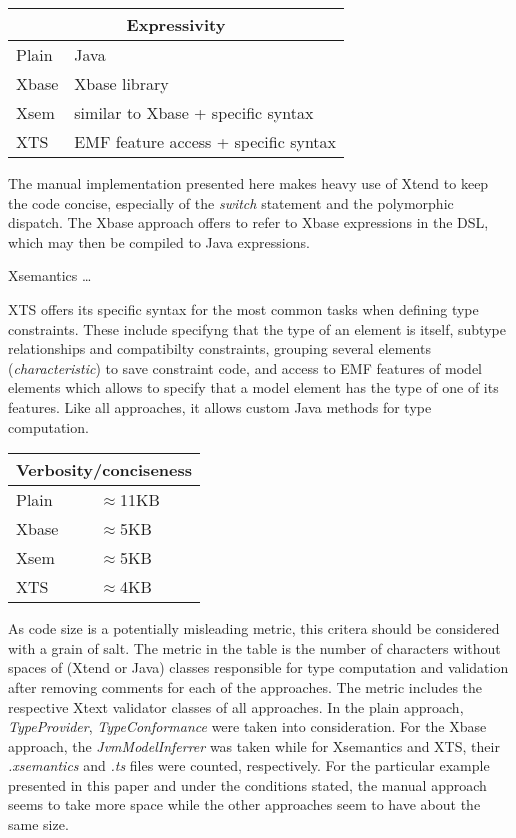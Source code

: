 \begin{tabularx}{\linewidth}{ l   X }
\multicolumn{2}{c}{Expressivity} \\ \hline
Plain & Java \\
Xbase & Xbase library \\
Xsem & similar to Xbase + specific syntax\\
XTS & EMF feature access + specific syntax\\
\end{tabularx}

\noindent The manual implementation presented here makes heavy use of Xtend to
keep the code concise, especially of the \emph{switch} statement and the polymorphic
dispatch. The Xbase approach offers to refer to Xbase expressions in the DSL,
which may then be compiled to Java expressions.

Xsemantics \ldots

XTS offers its specific syntax for the most common tasks when defining type
constraints. These include specifyng that the type of an element is
itself, subtype relationships and compatibilty constraints, grouping several
elements (\emph{characteristic}) to save constraint code, and access to EMF
features of model elements which allows to specify that a model element has the
type of one of its features. Like all approaches, it allows custom Java
methods for type computation.

\begin{tabularx}{\linewidth}{ l   X }
\multicolumn{2}{c}{Verbosity/conciseness} \\ \hline
Plain & $\approx$11KB \\%
Xbase &$\approx$5KB \\%
Xsem & $\approx$5KB \\%
XTS & $\approx$4KB \\%
\end{tabularx}

\noindent As code size is a potentially misleading metric, this critera should
be considered with a grain of salt. The metric in the table is the number of
characters without spaces of (Xtend or Java) classes responsible for type
computation and validation after removing comments for each of the approaches.
The metric includes the respective Xtext validator classes of all approaches. In
the plain approach, \emph{TypeProvider}, \emph{TypeConformance} were taken into
consideration. For the Xbase approach, the \emph{JvmModelInferrer} was taken
while for Xsemantics and XTS, their \emph{.xsemantics} and \emph{.ts} files were
counted, respectively. For the particular example presented in this paper and
under the conditions stated, the manual approach seems to take more space while
the other approaches seem to have about the same size.

